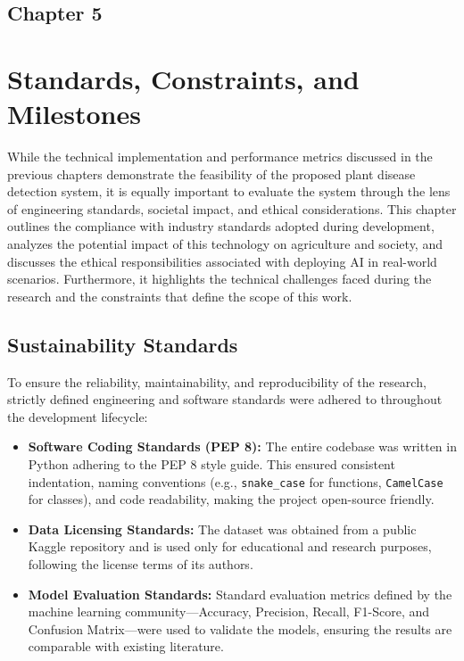 \begin{center}
    \section*{\fontsize{20}{20}\selectfont Chapter 5}
\end{center}
\vspace{10mm}

\section{Standards, Constraints, and Milestones}

While the technical implementation and performance metrics discussed in the previous chapters demonstrate the feasibility of the proposed plant disease detection system, it is equally important to evaluate the system through the lens of engineering standards, societal impact, and ethical considerations. This chapter outlines the compliance with industry standards adopted during development, analyzes the potential impact of this technology on agriculture and society, and discusses the ethical responsibilities associated with deploying AI in real-world scenarios. Furthermore, it highlights the technical challenges faced during the research and the constraints that define the scope of this work.

\subsection{Sustainability Standards}
To ensure the reliability, maintainability, and reproducibility of the research, strictly defined engineering and software standards were adhered to throughout the development lifecycle:
\begin{itemize}
    \item \textbf{Software Coding Standards (PEP 8):} The entire codebase was written in Python adhering to the PEP 8 style guide. This ensured consistent indentation, naming conventions (e.g., \texttt{snake\_case} for functions, \texttt{CamelCase} for classes), and code readability, making the project open-source friendly.
    \item \textbf{Data Licensing Standards:} The dataset was obtained from a public Kaggle repository and is used only for educational and research purposes, following the license terms of its authors.
    \item \textbf{Model Evaluation Standards:} Standard evaluation metrics defined by the machine learning community---Accuracy, Precision, Recall, F1-Score, and Confusion Matrix---were used to validate the models, ensuring the results are comparable with existing literature.
\end{itemize}

